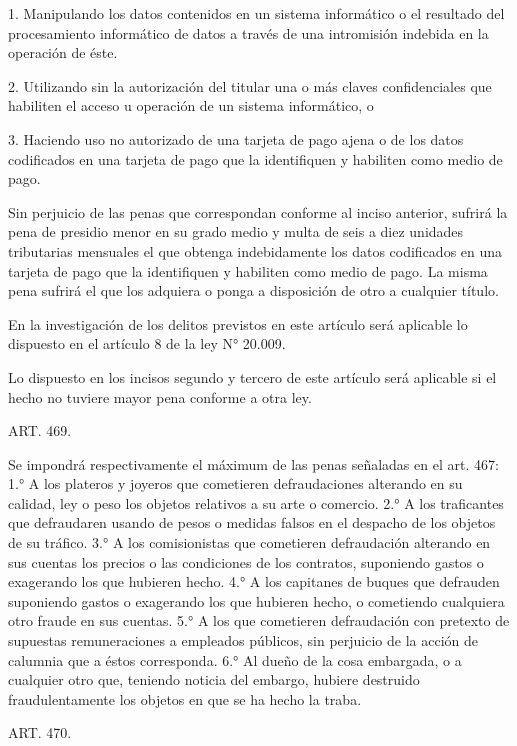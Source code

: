     1. Manipulando los datos contenidos en un sistema informático o el resultado del procesamiento informático de datos a través de una intromisión indebida en la operación de éste.

    2. Utilizando sin la autorización del titular una o más claves confidenciales que habiliten el acceso u operación de un sistema informático, o

    3. Haciendo uso no autorizado de una tarjeta de pago ajena o de los datos codificados en una tarjeta de pago que la identifiquen y habiliten como medio de pago.

    Sin perjuicio de las penas que correspondan conforme al inciso anterior, sufrirá la pena de presidio menor en su grado medio y multa de seis a diez unidades tributarias mensuales el que obtenga indebidamente los datos codificados en una tarjeta de pago que la identifiquen y habiliten como medio de pago. La misma pena sufrirá el que los adquiera o ponga a disposición de otro a cualquier título.

    En la investigación de los delitos previstos en este artículo será aplicable lo dispuesto en el artículo 8 de la ley N° 20.009.

    Lo dispuesto en los incisos segundo y tercero de este artículo será aplicable si el hecho no tuviere mayor pena conforme a otra ley.


    ART. 469.

    Se impondrá respectivamente el máximum de las penas señaladas en el art. 467:
    1.° A los plateros y joyeros que cometieren defraudaciones alterando en su calidad, ley o peso los objetos relativos a su arte o comercio.
    2.° A los traficantes que defraudaren usando de pesos o medidas falsos en el despacho de los objetos de su tráfico.
    3.° A los comisionistas que cometieren defraudación alterando en sus cuentas los precios o las condiciones de los contratos, suponiendo gastos o exagerando los que hubieren hecho.
    4.° A los capitanes de buques que defrauden suponiendo gastos o exagerando los que hubieren hecho, o cometiendo cualquiera otro fraude en sus cuentas.
    5.° A los que cometieren defraudación con pretexto de supuestas remuneraciones a empleados públicos, sin perjuicio de la acción de calumnia que a éstos corresponda.
    6.° Al dueño de la cosa embargada, o a cualquier otro que, teniendo noticia del embargo, hubiere destruido fraudulentamente los objetos en que se ha hecho la traba.



    ART. 470.

